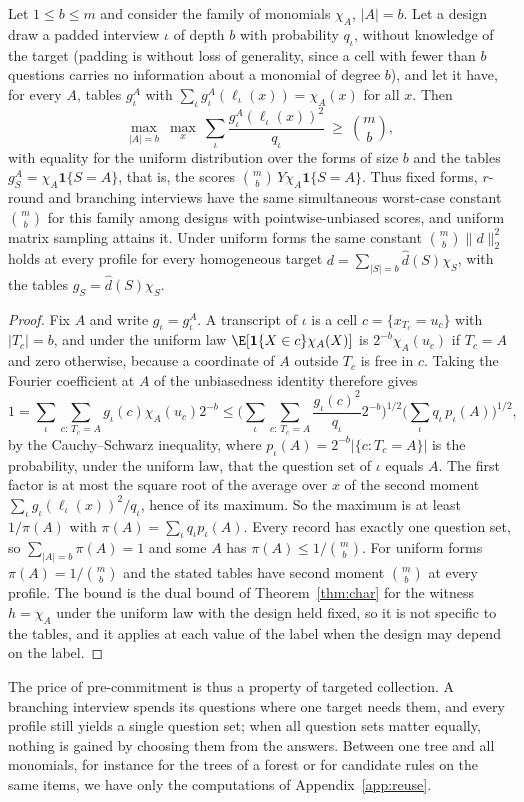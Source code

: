 \begin{proposition}\label{prop:family}
Let $1\le b\le m$ and consider the family of monomials $\chi_A$, $|A|=b$. Let a design draw a padded interview $\iota$ of depth $b$ with probability $q_\iota$, without knowledge of the target (padding is without loss of generality, since a cell with fewer than $b$ questions carries no information about a monomial of degree $b$), and let it have, for every $A$, tables $g^A_\iota$ with $\sum_\iota g^A_\iota(\ell_\iota(x))=\chi_A(x)$ for all $x$. Then
\[
 \max_{|A|=b}\ \max_{x}\ \sum_\iota\frac{g^A_\iota(\ell_\iota(x))^2}{q_\iota}\ \ge\ \binom mb ,
\]
with equality for the uniform distribution over the forms of size $b$ and the tables $g^A_S=\chi_A\mathbf 1\{S=A\}$, that is, the scores $\binom mb\,Y\chi_A\mathbf 1\{S=A\}$. Thus fixed forms, $r$-round and branching interviews have the same simultaneous worst-case constant $\binom mb$ for this family among designs with pointwise-unbiased scores, and uniform matrix sampling attains it. Under uniform forms the same constant $\binom mb\|d\|_2^2$ holds at every profile for every homogeneous target $d=\sum_{|S|=b}\hat d(S)\chi_S$, with the tables $g_S=\hat d(S)\chi_S$.
\end{proposition}
\begin{proof}
Fix $A$ and write $g_\iota=g^A_\iota$. A transcript of $\iota$ is a cell $c=\{x_{T_c}=u_c\}$ with $|T_c|=b$, and under the uniform law $\E[\mathbf 1\{X\in c\}\chi_A(X)]$ is $2^{-b}\chi_A(u_c)$ if $T_c=A$ and zero otherwise, because a coordinate of $A$ outside $T_c$ is free in $c$. Taking the Fourier coefficient at $A$ of the unbiasedness identity therefore gives
\[
 1=\sum_\iota\sum_{c:\,T_c=A}g_\iota(c)\chi_A(u_c)2^{-b}
 \le\Big(\sum_\iota\sum_{c:\,T_c=A}\frac{g_\iota(c)^2}{q_\iota}2^{-b}\Big)^{1/2}\Big(\sum_\iota q_\iota\,p_\iota(A)\Big)^{1/2},
\]
by the Cauchy--Schwarz inequality, where $p_\iota(A)=2^{-b}|\{c:T_c=A\}|$ is the probability, under the uniform law, that the question set of $\iota$ equals $A$. The first factor is at most the square root of the average over $x$ of the second moment $\sum_\iota g_\iota(\ell_\iota(x))^2/q_\iota$, hence of its maximum. So the maximum is at least $1/\pi(A)$ with $\pi(A)=\sum_\iota q_\iota p_\iota(A)$. Every record has exactly one question set, so $\sum_{|A|=b}\pi(A)=1$ and some $A$ has $\pi(A)\le1/\binom mb$. For uniform forms $\pi(A)=1/\binom mb$ and the stated tables have second moment $\binom mb$ at every profile. The bound is the dual bound of Theorem~\ref{thm:char} for the witness $h=\chi_A$ under the uniform law with the design held fixed, so it is not specific to the tables, and it applies at each value of the label when the design may depend on the label.
\end{proof}
The price of pre-commitment is thus a property of targeted collection. A branching interview spends its questions where one target needs them, and every profile still yields a single question set; when all question sets matter equally, nothing is gained by choosing them from the answers. Between one tree and all monomials, for instance for the trees of a forest or for candidate rules on the same items, we have only the computations of Appendix~\ref{app:reuse}.

